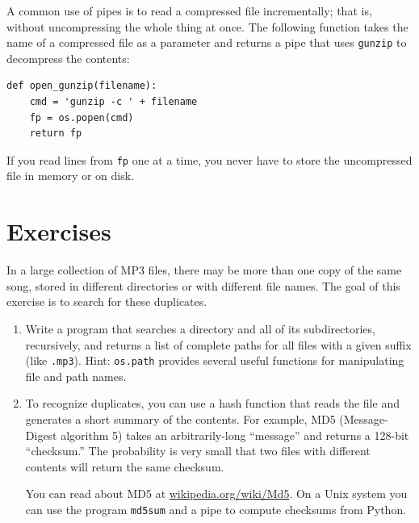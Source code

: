 A common use of pipes is to read a compressed file incrementally;
that is, without uncompressing the whole thing at once.  The
following function takes the name of a compressed file as a
parameter and returns a pipe that uses {\tt gunzip} to decompress
the contents:

\beforeverb
\begin{verbatim}
def open_gunzip(filename):
    cmd = 'gunzip -c ' + filename
    fp = os.popen(cmd)
    return fp
\end{verbatim}
\afterverb
%
If you read lines from {\tt fp} one at a time, you never have
to store the uncompressed file in memory or on disk.

\section{Exercises}

\begin{ex}
\label{checksum}


In a large collection of MP3 files, there may be more than one
copy of the same song, stored in different directories or with
different file names.  The goal of this exercise is to search for
these duplicates.

\begin{enumerate}

\item Write a program that searches a directory and all of its
subdirectories, recursively, and returns a list of complete paths
for all files with a given suffix (like {\tt .mp3}).
Hint: {\tt os.path} provides several useful functions for
manipulating file and path names.


\item To recognize duplicates, you can use a hash function that
reads the file and generates a short summary
of the contents.  For example,
MD5 (Message-Digest algorithm 5) takes an arbitrarily-long
``message'' and returns a 128-bit ``checksum.''  The probability
is very small that two files with different contents will
return the same checksum.

You can read about MD5 at \url{wikipedia.org/wiki/Md5}.  On
a Unix system you can use the program {\tt md5sum} and a pipe to
compute checksums from Python.


\end{enumerate}

\end{ex}



